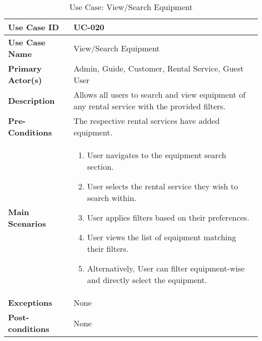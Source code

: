 \begin{table}[ht]
    \centering
    \begin{tabular}{|l|p{}|}
        \hline
        \textbf{Use Case ID} & UC-020 \\
        \hline
        \textbf{Use Case Name} & View/Search Equipment \\
        \hline
        \textbf{Primary Actor(s)} & Admin, Guide, Customer, Rental Service, Guest User \\
        \hline
        \textbf{Description} & Allows all users to search and view equipment of any rental service with the provided filters. \\
        \hline
        \textbf{Pre-Conditions} & The respective rental services have added equipment. \\
        \hline
        \textbf{Main Scenarios} & 
        \begin{enumerate}[label=\arabic*.,itemsep=0pt]
            \item User navigates to the equipment search section.
            \item User selects the rental service they wish to search within.
            \item User applies filters based on their preferences.
            \item User views the list of equipment matching their filters.
            \item Alternatively, User can filter equipment-wise and directly select the equipment.
        \end{enumerate} \\
        \hline
        \textbf{Exceptions} & None \\
        \hline
        \textbf{Post-conditions} & None \\
        \hline
    \end{tabular}
    \label{tab:use-case-view-search-equipment}
    \caption{Use Case: View/Search Equipment}
\end{table}


